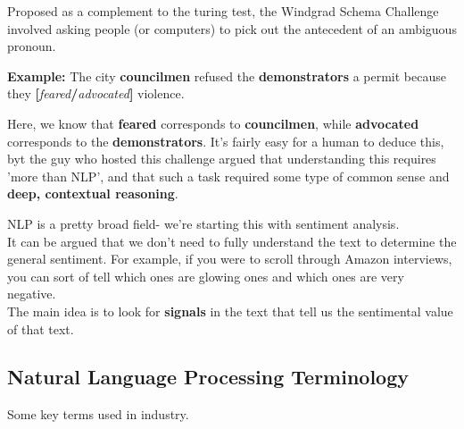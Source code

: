 \documentclass[english, 10pt]{article}
\begin{document}
\begin{tcolorbox}[title=Aside: Windgrad Schema Challenge,colframe=black,colback=white,arc=0pt,fonttitle=\bfseries]
Proposed as a complement to the turing test, the Windgrad Schema Challenge involved asking people (or computers) to pick out the antecedent of an ambiguous pronoun.\\
\begin{myproof}
\textbf{Example:} The city \textbf{councilmen} refused the \textbf{demonstrators} a permit because they \textbf{[}\textit{feared}\textbf{/}\textit{advocated}\textbf{]} violence. 
\end{myproof}

\hfill \break Here, we know that \textbf{feared} corresponds to \textbf{councilmen}, while \textbf{advocated} corresponds to the \textbf{demonstrators}. It's fairly easy for a human to deduce this, byt the guy who hosted this challenge argued that understanding this requires 'more than NLP', and that such a task required some type of common sense and \textbf{deep, contextual reasoning}.
\end{tcolorbox}

NLP is a pretty broad field- we're starting this with sentiment analysis.\\

It can be argued that we don't need to fully understand the text to determine the general sentiment. For example, if you were to scroll through Amazon interviews, you can sort of tell which ones are glowing ones and which ones are very negative.\\

The main idea is to look for \textbf{signals} in the text that tell us the sentimental value of that text.

\subsection{Natural Language Processing Terminology}

Some key terms used in industry.
\end{document}

